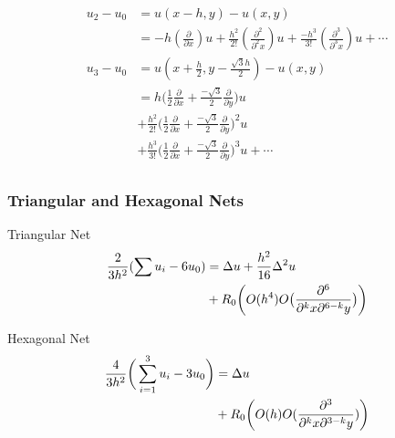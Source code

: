 \documentclass{beamer}
\begin{document}
\begin{frame}
\begin{minipage}{.5\textwidth}
\begin{align*}
u_2 - u_0 &= u(x-h,y) - u(x,y) \\
&= -h (\frac{\partial}{\partial x})u + \frac{h^2}{2!}(\frac{\partial^2 }{\partial^2 x})u + \frac{-h^3}{3!} (\frac{\partial^3}{\partial^3 x})u + \cdots\\
u_3 - u_0 &= u(x+\frac{h}{2},y-\frac{\sqrt{3}h}{2}) - u(x,y) \\
&= h \bigg(\frac{1}{2}\frac{\partial}{\partial x} + \frac{-\sqrt{3}}{2} \frac{\partial}{\partial y} \bigg)u \\
&+ \frac{h^2}{2!}\bigg(\frac{1}{2}\frac{\partial}{\partial x} + \frac{-\sqrt{3}}{2} \frac{\partial}{\partial y} \bigg)^2 u \\
&+ \frac{h^3}{3!} \bigg(\frac{1}{2}\frac{\partial}{\partial x} + \frac{-\sqrt{3}}{2} \frac{\partial}{\partial y} \bigg)^3 u + \cdots\\
\end{align*}
\end{minipage}
\end{frame}


\begin{frame}
\frametitle{Triangular and Hexagonal Nets}
\tiny

\centering
\begin{minipage}{.5\textwidth}
  \centering
Triangular Net
\begin{align}
\frac{2}{3h^2}(\sum u_i - 6 u_0) &= \Delta u + \frac{h^2}{16} \Delta^2 u \notag \\
&+ R_0 \bigg(O(h^4)O\big( \frac{\partial^6}{\partial^k x \partial^{6-k}y}\big)\bigg)
\end{align}
\end{minipage}%
\begin{minipage}{.5\textwidth}
  \centering
Hexagonal Net
\begin{align}
\frac{4}{3h^2} \bigg( \sum_{i=1}^3 u_i - 3 u_0 \bigg) &= \Delta u \notag \\
&+ R_0 \bigg( O(h) O(\frac{\partial^3}{\partial^k x \partial^{3-k} y})\bigg)
\end{align}
\end{minipage}

\end{frame}



\end{document}
